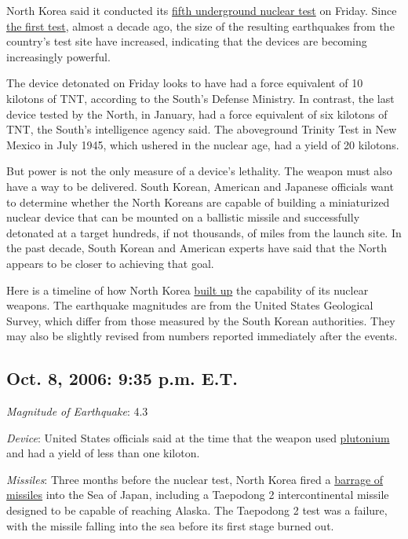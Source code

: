North Korea said it conducted its
\href{http://www.nytimes3xbfgragh.onion/2016/09/09/world/asia/north-korea-nuclear-test.html}{fifth
underground nuclear test} on Friday. Since
\href{http://www.nytimes3xbfgragh.onion/2006/10/09/world/asia/09korea.html}{the
first test}, almost a decade ago, the size of the resulting earthquakes
from the country's test site have increased, indicating that the devices
are becoming increasingly powerful.

The device detonated on Friday looks to have had a force equivalent of
10 kilotons of TNT, according to the South's Defense Ministry. In
contrast, the last device tested by the North, in January, had a force
equivalent of six kilotons of TNT, the South's intelligence agency said.
The aboveground Trinity Test in New Mexico in July 1945, which ushered
in the nuclear age, had a yield of 20 kilotons.

But power is not the only measure of a device's lethality. The weapon
must also have a way to be delivered. South Korean, American and
Japanese officials want to determine whether the North Koreans are
capable of building a miniaturized nuclear device that can be mounted on
a ballistic missile and successfully detonated at a target hundreds, if
not thousands, of miles from the launch site. In the past decade, South
Korean and American experts have said that the North appears to be
closer to achieving that goal.

Here is a timeline of how North Korea
\href{http://www.nytimes3xbfgragh.onion/2016/09/10/world/asia/north-korea-nuclear-test-statement.html}{built
up} the capability of its nuclear weapons. The earthquake magnitudes are
from the United States Geological Survey, which differ from those
measured by the South Korean authorities. They may also be slightly
revised from numbers reported immediately after the events.

\hypertarget{oct-8-2006-935-pm-et}{%
\subsection{Oct. 8, 2006: 9:35 p.m. E.T.}\label{oct-8-2006-935-pm-et}}

\emph{Magnitude of Earthquake}: 4.3

\emph{Device}: United States officials said at the time that the weapon
used
\href{http://www.nytimes3xbfgragh.onion/2006/10/17/world/asia/17diplo.html}{plutonium}
and had a yield of less than one kiloton.

\emph{Missiles}: Three months before the nuclear test, North Korea fired
a
\href{http://www.nytimes3xbfgragh.onion/2006/07/05/world/asia/05missile.html}{barrage
of missiles} into the Sea of Japan, including a Taepodong 2
intercontinental missile designed to be capable of reaching Alaska. The
Taepodong 2 test was a failure, with the missile falling into the sea
before its first stage burned out.

